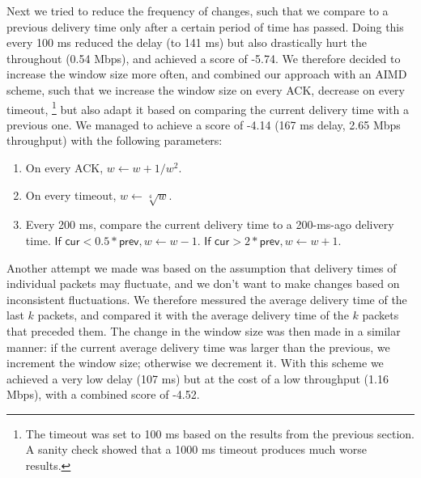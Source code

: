 \documentclass[a4paper,10pt]{article}
\begin{document}
Next we tried to reduce the frequency of changes, such that we compare to a previous 
delivery time only after a certain period of time has passed. Doing this every 100 ms 
reduced the delay (to 141 ms) but also drastically hurt the throughout (0.54 Mbps), 
and achieved a score of -5.74. We therefore decided to increase the window size more 
often, and combined our approach with an AIMD scheme, such that we increase the window 
size on every ACK, decrease on every timeout,
\footnote{The timeout was set to 100 ms based on the results from the previous section. 
A sanity check showed that a 1000 ms timeout produces much worse results.} 
but also adapt it based on comparing the current delivery time with a previous one. 
We managed to achieve a score of -4.14 (167 ms delay, 2.65 Mbps throughput) with the 
following parameters: 

\begin{enumerate}
 \item On every ACK, $ w \leftarrow w + 1/w^2 $.
 \item On every timeout, $ w \leftarrow \sqrt[4]{w} $.
 \item Every 200 ms, compare the current delivery time to a 200-ms-ago delivery time. 
 $ \textsf{If cur} < 0.5 * \textsf{prev}, w \leftarrow w-1$. $ \textsf{If cur} > 2 * 
 \textsf{prev}, w \leftarrow w+1 $. 
\end{enumerate}

Another attempt we made was based on the assumption that delivery times of individual 
packets may fluctuate, and we don't want to make changes based on inconsistent 
fluctuations. We therefore messured the average delivery time of the last $k$ packets,
and compared it with the average delivery time of the $k$ packets that preceded them. 
The change in the window size was then made in a similar manner: if the current average
delivery time was larger than the previous, we increment the window size; otherwise we 
decrement it. With this scheme we achieved a very low delay (107 ms) but at the cost
of a low throughput (1.16 Mbps), with a combined score of -4.52. 
\end{document}

